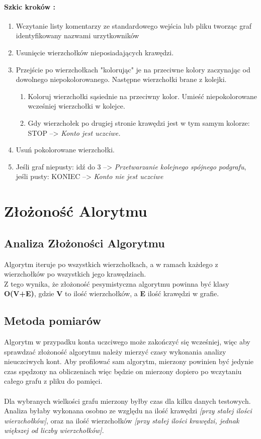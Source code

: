 \documentclass[11pt]{article} %
\begin{document}
\paragraph{Szkic kroków : }
\renewcommand{\labelenumi}{\arabic{enumi}}
\begin{enumerate}
\item
Wczytanie listy komentarzy ze standardowego wejścia lub pliku tworząc graf identyfikowany nazwami urzytkowników
\item
Usunięcie wierzchołków nieposiadających krawędzi.
\item
Przejście po wierzchołkach "kolorując" je na przeciwne kolory zaczynając od dowolnego niepokolorowanego. Następne wierzchołki brane z kolejki.
\renewcommand{\labelenumii}{\Roman{enumii}}
\begin{enumerate}
\item
Koloruj wierzchołki sąsiednie na przeciwny kolor. Umieść niepokolorowane wcześniej wierzchołki w kolejce.
\item
Gdy wierzchołek po drugiej stronie krawędzi jest w tym samym kolorze: \\STOP --> \textsl{Konto jest uczciwe.}
\end{enumerate}
\item
Usuń pokolorowane wierzchołki.
\item
Jeśli graf niepusty: idź do 3 --> \textsl{Przetwarzanie kolejnego spójnego podgrafu},\\ jeśli pusty: KONIEC --> \textsl{Konto nie jest uczciwe}
\end{enumerate}
\section{Złożoność Alorytmu}
\subsection{Analiza Złożoności Algorytmu}
Algorytm iteruje po wszystkich wierzchołkach, a w ramach każdego z wierzchołków po wszystkich jego krawędziach.\\
Z tego wynika, że złożoność pesymistyczna algorytmu powinna być klasy \textbf{O(V+E)}, gdzie \textbf{V} to ilość wierzchołków, a \textbf{E} ilość krawędzi w grafie.
\subsection{Metoda pomiarów}
Algorytm w przypadku konta uczciwego może zakończyć się wcześniej, więc aby sprawdzać złożoność algorytmu należy mierzyć czasy wykonania analizy nieuczciwych kont. Aby profilować sam algorytm, mierzony powinien być jedynie czas spędzony na obliczeniach więc będzie on mierzony dopiero po wczytaniu całego grafu z pliku do pamięci. \\\\
Dla wybranych wielkości grafu mierzony byłby czas dla kilku danych testowych. Analiza byłaby wykonana osobno ze względu na ilość krawędzi \textsl{[przy stałej ilości wierzchołków]}, oraz na ilość wierzchołków \textsl{[przy stałej ilości krawędzi, jednak większej od liczby wierzchołków]}.
\end{document}
